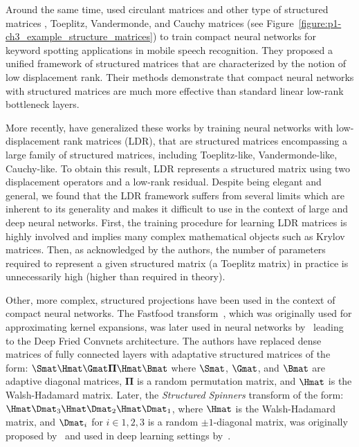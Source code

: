 {Around the same time, \citet{sindhwani2015structured} used circulant matrices and other type of structured matrices \eg, Toeplitz, Vandermonde, and Cauchy matrices (see Figure~\ref{figure:p1-ch3_example_structure_matrices}) to train compact neural networks for keyword spotting applications in mobile speech recognition.
They proposed a unified framework of structured matrices that are characterized by the notion of low displacement rank.
Their methods demonstrate that compact neural networks with structured matrices are much more effective than standard linear low-rank bottleneck layers.

More recently, \citet{thomas2018learning} have generalized these works by training neural networks with low-displacement rank matrices (LDR), that are structured matrices encompassing a large family of structured matrices, including Toeplitz-like, Vandermonde-like, Cauchy-like.
To obtain this result, LDR represents a structured matrix using two displacement operators and a low-rank residual.
Despite being elegant and general, we found that the LDR framework suffers from several limits which are inherent to its generality and makes it difficult to use in the context of large and deep neural networks.
First, the training procedure for learning LDR matrices is highly involved and implies many complex mathematical objects such as Krylov matrices.
Then, as acknowledged by the authors, the number of parameters required to represent a given structured matrix (a Toeplitz matrix) in practice is unnecessarily high (higher than required in theory). 

Other, more complex, structured projections have been used in the context of compact neural networks.
The Fastfood transform~\cite{le2013fastfood}, which was originally used for approximating kernel expansions, was later used in neural networks by~\citet{yang2015deep} leading to the Deep Fried Convnets architecture.
The authors have replaced dense matrices of fully connected layers with adaptative structured matrices of the form: $\Smat\Hmat\Gmat\mathbf{\Pi}\Hmat\Bmat$ where $\Smat$, $\Gmat$, and $\Bmat$ are adaptive diagonal matrices, $\mathbf{\Pi}$ is a random permutation matrix, and $\Hmat$ is the Walsh-Hadamard matrix.
Later, the \emph{Structured Spinners} transform of the form: $\Hmat\Dmat_3\Hmat\Dmat_2\Hmat\Dmat_1$, where $\Hmat$ is the Walsh-Hadamard matrix, and $\Dmat_i$ for $i \in {1, 2, 3}$ is a random $\pm1$-diagonal matrix, was originally proposed by~\citet{andoni2015practical} and used in deep learning settings by~\citet{bojarski2017structured}.




}

